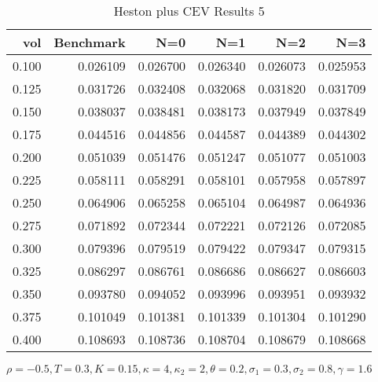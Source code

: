 \begin{table}[ht]
  \centering
  \caption{Heston plus CEV Results 5}
  \begin{tabular}{rrrrrr}
  \toprule
    vol &       Benchmark &       N=0 &       N=1 &       N=2 &       N=3 \\
  \midrule
  0.100 & 0.026109 & 0.026700 & 0.026340 & 0.026073 & 0.025953 \\
  0.125 & 0.031726 & 0.032408 & 0.032068 & 0.031820 & 0.031709 \\
  0.150 & 0.038037 & 0.038481 & 0.038173 & 0.037949 & 0.037849 \\
  0.175 & 0.044516 & 0.044856 & 0.044587 & 0.044389 & 0.044302 \\
  0.200 & 0.051039 & 0.051476 & 0.051247 & 0.051077 & 0.051003 \\
  0.225 & 0.058111 & 0.058291 & 0.058101 & 0.057958 & 0.057897 \\
  0.250 & 0.064906 & 0.065258 & 0.065104 & 0.064987 & 0.064936 \\
  0.275 & 0.071892 & 0.072344 & 0.072221 & 0.072126 & 0.072085 \\
  0.300 & 0.079396 & 0.079519 & 0.079422 & 0.079347 & 0.079315 \\
  0.325 & 0.086297 & 0.086761 & 0.086686 & 0.086627 & 0.086603 \\
  0.350 & 0.093780 & 0.094052 & 0.093996 & 0.093951 & 0.093932 \\
  0.375 & 0.101049 & 0.101381 & 0.101339 & 0.101304 & 0.101290 \\
  0.400 & 0.108693 & 0.108736 & 0.108704 & 0.108679 & 0.108668 \\
  \bottomrule
  \end{tabular}
  \small{$\rho = -0.5,T=0.3,K=0.15, \kappa = 4, \kappa_2 =2, \theta =0.2, \sigma_1 =0.3, \sigma_2 = 0.8, \gamma = 1.6$}
  \end{table}

